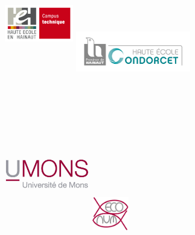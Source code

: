 \documentclass[]{report}
\begin{document}
\begin{centering}

\begin{figure}

\includegraphics[width=3.0cm, height=6cm]{../image/technique-logo.jpg} 
\includegraphics[width=5.0cm, height=3.5cm]{../image/condorcet.jpg}
\includegraphics[width=3.7cm, height=7cm]{../image/UMONS-logo.jpg}
\includegraphics[width=1.6cm, height=3.5cm]{../image/ECONUM-logo.pdf}

\end{figure}


\end{centering}
\end{document}
